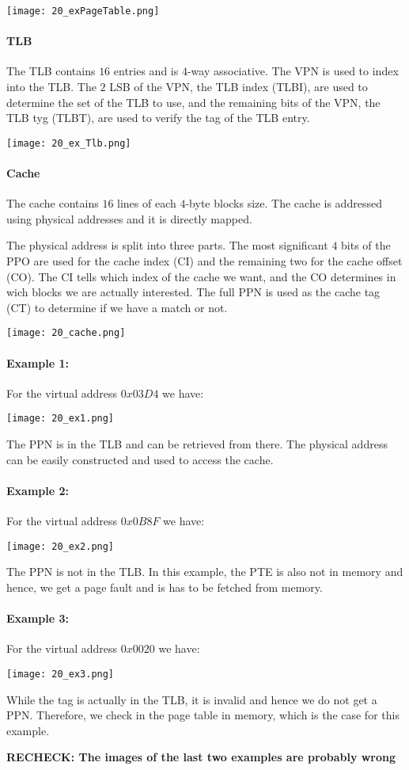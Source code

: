 \texttt{[image: 20\_exPageTable.png]}

\paragraph{TLB}
The TLB contains $16$ entries and is $4$-way associative. The VPN is used to index into the TLB. The $2$ LSB of the VPN, the TLB index (TLBI), are used to determine the set of the TLB to use, and the remaining bits of the VPN, the TLB tyg (TLBT), are used to verify the tag of the TLB entry.

\texttt{[image: 20\_ex\_Tlb.png]}

\paragraph{Cache}
The cache contains $16$ lines of each $4$-byte blocks size. The cache is addressed using physical addresses and it is directly mapped.

The physical address is split into three parts. The most significant $4$ bits of the PPO are used for the cache index (CI) and the remaining two for the cache offset (CO). The CI tells which index of the cache we want, and the CO determines in wich blocks we are actually interested. The full PPN is used as the cache tag (CT) to determine if we have a match or not.

\texttt{[image: 20\_cache.png]}

\paragraph{Example 1:}
For the virtual address $0x03D4$ we have:

\texttt{[image: 20\_ex1.png]}

The PPN is in the TLB and can be retrieved from there. The physical address can be easily constructed and used to access the cache.


\paragraph{Example 2:}
For the virtual address $0x0B8F$ we have:

\texttt{[image: 20\_ex2.png]}

The PPN is not in the TLB. In this example, the PTE is also not in memory and hence, we get a page fault and is has to be fetched from memory.

\paragraph{Example 3:}
For the virtual address $0x0020$ we have:

\texttt{[image: 20\_ex3.png]}

While the tag is actually in the TLB, it is invalid and hence we do not get a PPN. Therefore, we check in the page table in memory, which is the case for this example.


\textbf{RECHECK: The images of the last two examples are probably wrong}
